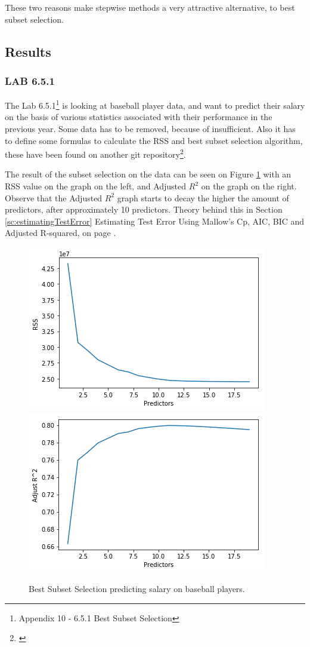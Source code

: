 These two reasons make stepwise methods a very attractive alternative, to best subset selection. 

\subsection{Results}
\subsubsection*{LAB 6.5.1}
The Lab 6.5.1\footnote{Appendix 10 - 6.5.1 Best Subset Selection} is looking at baseball player data, and want to predict their salary on the basis of various statistics associated with their performance in the previous year. Some data has to be removed, because of insufficient. Also it has to define some formulas to calculate the RSS and best subset selection algorithm, these have been found on another git repository\footnote{\cite{Xu2017}}.

The result of the subset selection on the data can be seen on Figure \ref{fig:bestSubsetSelection} with an RSS value on the graph on the left, and Adjusted $R^2$ on the graph on the right. Observe that the Adjusted $R^2$ graph starts to decay the higher the  amount of predictors, after approximately 10 predictors. Theory behind this in Section \ref{sc:estimatingTestError} Estimating Test Error Using Mallow's Cp, AIC, BIC and Adjusted R-squared, on page \pageref{sc:estimatingTestError}.

\begin{figure}[h]
	\centering
	\includegraphics[scale=0.5]{subsetSelection/selectionMethods/fig/bestSubsetSelectionRSS.png}
	\includegraphics[scale=0.5]{subsetSelection/selectionMethods/fig/bestSubsetSelectionRsquared.png}
	\caption{Best Subset Selection predicting salary on baseball players.}
	\label{fig:bestSubsetSelection}
\end{figure}


